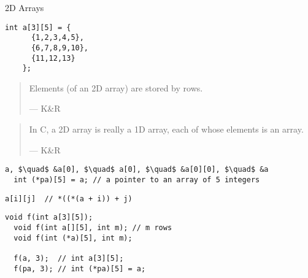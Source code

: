 \begin{frame}{}
  \centerline{\LARGE 2D Arrays}
\end{frame}

\begin{frame}[fragile]{}
  \begin{lstlisting}[style = Cstyle]
    int a[3][5] = {
      {1,2,3,4,5}, 
      {6,7,8,9,10},
      {11,12,13}
    }; 
  \end{lstlisting}

  \vspace{0.40cm}
  \pause
  \begin{quote}
    Elements (of an 2D array) are stored by rows.

    \hfill --- K\&R
  \end{quote}

  \vspace{0.80cm}
  \centerline{}
\end{frame}

\begin{frame}[fragile]{}
  \begin{quote}
    In C, a 2D array is really a 1D array,
    each of whose elements is an array.

    \hfill --- K\&R
  \end{quote}

  \vspace{0.50cm}
  \pause
  \begin{lstlisting}[style = Cstyle]
  a, $\quad$ &a[0], $\quad$ a[0], $\quad$ &a[0][0], $\quad$ &a
  int (*pa)[5] = a; // a pointer to an array of 5 integers
  \end{lstlisting}

  \vspace{0.30cm}
  \centerline{}

  \vspace{0.50cm}
  \pause
  \begin{lstlisting}[style = Cstyle]
  a[i][j]  // *((*(a + i)) + j)
  \end{lstlisting}
\end{frame}

\begin{frame}[fragile]{}
  \begin{lstlisting}[style = Cstyle]
  void f(int a[3][5]);
  void f(int a[][5], int m); // m rows
  void f(int (*a)[5], int m);

  f(a, 3);  // int a[3][5];
  f(pa, 3); // int (*pa)[5] = a;
  \end{lstlisting}
\end{frame}

